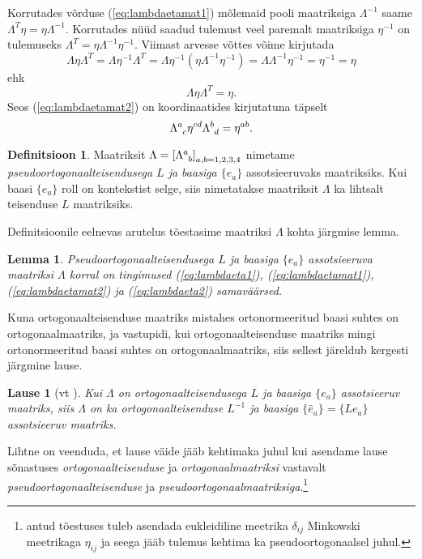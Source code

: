 \documentclass[12pt,a4paper,oneside]{article}
\theoremstyle{plain}
\newtheorem{lemma}{Lemma}[section]
\newtheorem{lause}{Lause}[section]
\theoremstyle{definition}
\newtheorem{definitsioon}{Definitsioon}[section]
\numberwithin{equation}{section}
\begin{document}
Korrutades võrduse (\ref{eq:lambdaetamat1}) mõlemaid pooli maatriksiga 
$\Lambda^{-1}$ saame $\Lambda^T \eta = \eta \Lambda^{-1}$. Korrutades 
nüüd saadud tulemust veel paremalt maatriksiga $\eta^{-1}$ on 
tulemuseks $\Lambda^T = \eta \Lambda^{-1} \eta^{-1}$. Viimast arvesse 
võttes võime kirjutada 
\[\Lambda \eta \Lambda^T = \Lambda \eta^{-1} 
\Lambda^T = \Lambda \eta^{-1} \left( \eta \Lambda^{-1} \eta^{-1} 
\right) = \Lambda \Lambda^{-1} \eta^{-1} = \eta^{-1} = \eta\] 
ehk
\begin{equation} \label{eq:lambdaetamat2}
\Lambda \eta \Lambda^T = \eta.
\end{equation}
Seos (\ref{eq:lambdaetamat2}) on koordinaatides kirjutatuna täpselt
\begin{equation} \label{eq:lambdaeta2}
\Lambda\indices{^a_c} \eta^{cd} \Lambda\indices{^b_d} = \eta^{ab}.
\end{equation}

\begin{definitsioon}
Maatriksit $\Lambda = \left[\Lambda\indices{^a_b} 
\right]_{a,b=1,2,3,4}$ nimetame \emph{pseudoortogonaalteisendusega 
$L$ ja baasiga $\{e_a\}$} assotsieeruvaks maatriksiks. Kui baasi 
$\{e_a\}$ roll on kontekstist selge, siis nimetatakse maatriksit 
$\Lambda$ ka lihtsalt teisenduse $L$ maatriksiks.
\end{definitsioon}

Definitsioonile eelnevas arutelus tõestasime maatriksi $\Lambda$ 
kohta järgmise lemma.
\begin{lemma} \label{lemma:lambdainvariant}
Pseudoortogonaalteisendusega $L$ ja baasiga $\{e_a\}$ assotsieeruva 
maatriksi $\Lambda$ korral on tingimused (\ref{eq:lambdaeta1}), 
(\ref{eq:lambdaetamat1}), (\ref{eq:lambdaetamat2}) ja (\ref{eq:lambdaeta2}) 
samaväärsed.
\end{lemma}

Kuna ortogonaalteisenduse maatriks mistahes ortonormeeritud baasi 
suhtes on ortogonaalmaatriks, ja vastupidi, kui ortogonaalteisenduse 
maatriks mingi ortonormeeritud baasi suhtes on ortogonaalmaatriks, 
siis sellest järeldub kergesti järgmine lause.

\begin{lause}[vt \textnormal{\cite[lk 271]{Kilp}}]
Kui $\Lambda$ on ortogonaalteisendusega $L$ ja baasiga $\{e_a\}$ 
assotsieeruv maatriks, siis $\Lambda$ on ka ortogonaalteisenduse 
$L^{-1}$ ja baasiga $\{\hat{e}_a\} = \{Le_a\}$ assotsieeruv maatriks.
\end{lause}

Lihtne on veenduda, et lause väide jääb kehtimaka juhul kui asendame 
lause sõnastuses \emph{ortogonaalteisenduse} ja 
\emph{ortogonaalmaatriksi} vastavalt \emph{pseudoortogonaalteisenduse} 
ja \emph{pseudoortogonaalmaatriksiga}.\footnote{\cite{Kilp} antud 
tõestuses tuleb asendada eukleidiline meetrika $\delta_{ij}$ 
Minkowski meetrikaga $\eta_{ij}$ ja seega jääb tulemus kehtima 
ka pseudoortogonaalsel juhul.}
\end{document}
